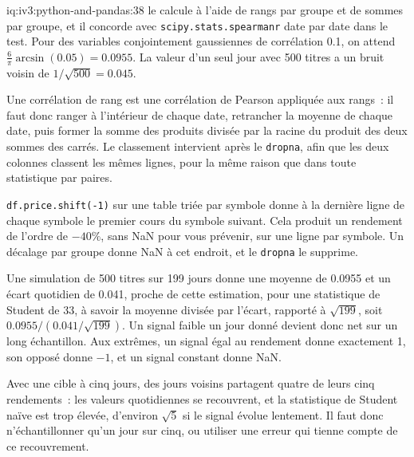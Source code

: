 \begin{solution}{iq:iv3:python-and-pandas:38}
 le calcule à l'aide de rangs par groupe et de sommes par groupe, et il concorde avec \texttt{scipy.stats.spearmanr} date par date dans le test. Pour des variables conjointement gaussiennes de corrélation 0.1, on attend $\frac{6}{\pi} \arcsin(0.05) = 0.0955$. La valeur d'un seul jour avec 500 titres a un bruit voisin de $1 / \sqrt{500} = 0.045$.
\label{lst:iv3:pp:ic}

Une corrélation de rang est une corrélation de Pearson appliquée aux rangs~: il faut donc ranger à l'intérieur de chaque date, retrancher la moyenne de chaque date, puis former la somme des produits divisée par la racine du produit des deux sommes des carrés. Le classement intervient après le \texttt{dropna}, afin que les deux colonnes classent les mêmes lignes, pour la même raison que dans toute statistique par paires.

\texttt{df.price.shift(-1)} sur une table triée par symbole donne à la dernière ligne de chaque symbole le premier cours du symbole suivant. Cela produit un rendement de l'ordre de $-40\%$, sans NaN pour vous prévenir, sur une ligne par symbole. Un décalage par groupe donne NaN à cet endroit, et le \texttt{dropna} le supprime.

Une simulation de 500 titres sur 199 jours donne une moyenne de 0.0955 et un écart quotidien de 0.041, proche de cette estimation, pour une statistique de Student de 33, à savoir la moyenne divisée par l'écart, rapporté à $\sqrt{199}$, soit $0.0955 / (0.041 / \sqrt{199})$. Un signal faible un jour donné devient donc net sur un long échantillon. Aux extrêmes, un signal égal au rendement donne exactement 1, son opposé donne $-1$, et un signal constant donne NaN.

Avec une cible à cinq jours, des jours voisins partagent quatre de leurs cinq rendements~: les valeurs quotidiennes se recouvrent, et la statistique de Student naïve est trop élevée, d'environ $\sqrt{5}$ si le signal évolue lentement. Il faut donc n'échantillonner qu'un jour sur cinq, ou utiliser une erreur qui tienne compte de ce recouvrement.

\end{solution}

